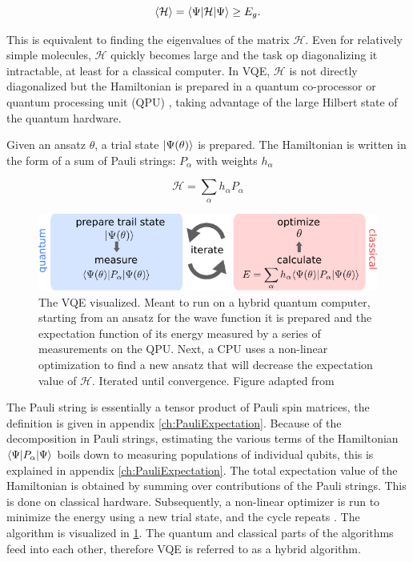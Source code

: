 \begin{equation}\label{eq:VariationalPrinciple}
	\left\langle \mathcal{H} \right\rangle = \langle\Psi\rvert\mathcal{H} \lvert\Psi\rangle \geq E_g.
\end{equation}

This is equivalent to finding the eigenvalues of the matrix $\mathcal{H}$. Even for relatively simple molecules, $\mathcal{H}$ quickly becomes large and the task op diagonalizing it intractable, at least for a classical computer. In \ac{VQE}, $\mathcal{H}$ is not directly diagonalized but the Hamiltonian is prepared in a quantum co-processor or quantum processing unit (QPU) \cite{Henriet2020,Peruzzo2014}, taking advantage of the large Hilbert state of the quantum hardware. 

Given an ansatz $\theta$, a trial state $\lvert\Psi(\theta)\rangle$ is prepared. The Hamiltonian is written in the form of a sum of Pauli strings: $P_{\alpha}$ with weights $h_{\alpha}$ \cite{McClean2016,Moll2018}

\begin{equation}\label{eq:PauliDecomposition}
	\mathcal{H} = \sum_{\alpha} h_{\alpha} P_{\alpha}
\end{equation}

\begin{figure}
	\centering
	\includegraphics[width=0.75\linewidth]{figures/VQE.pdf}
	\caption{The \ac{VQE} visualized. Meant to run on a hybrid quantum computer, starting from an ansatz for the wave function it is prepared and the expectation function of its energy measured by a series of measurements on the QPU. Next, a CPU uses a non-linear optimization to find a new ansatz that will decrease the expectation value of $\mathcal{H}$. Iterated until convergence. Figure adapted from \cite{Moll2018}}
	\label{fig:VQE}
\end{figure}

The Pauli string is essentially a tensor product of Pauli spin matrices, the definition is given in appendix \ref{ch:PauliExpectation}. Because of the decomposition in Pauli strings, estimating the various terms of the Hamiltonian $\langle\Psi\rvert P_{\alpha} \lvert\Psi\rangle$ boils down to measuring populations of individual qubits, this is explained in appendix \ref{ch:PauliExpectation}. The total expectation value of the Hamiltonian is obtained by summing over contributions of the Pauli strings. This is done on classical hardware. Subsequently, a non-linear optimizer is run to minimize the energy using a new trial state, and the cycle repeats \cite{Moll2018}. The algorithm is visualized in \cref{fig:VQE}. The quantum and classical parts of the algorithms feed into each other, therefore \ac{VQE} is referred to as a hybrid algorithm. 


